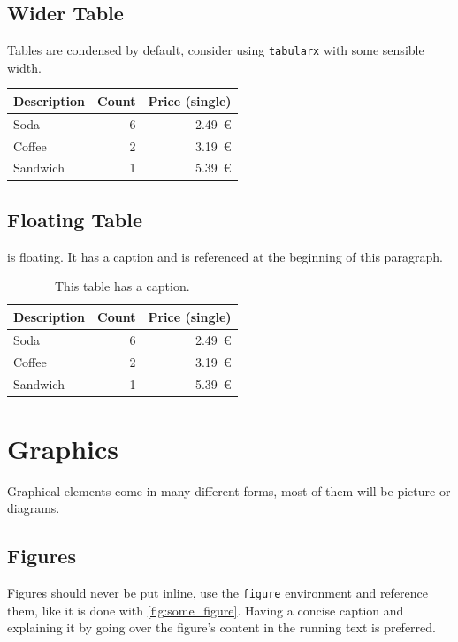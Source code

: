 \subsection{Wider Table}

Tables are condensed by default, consider using \texttt{tabularx} with some sensible width.

\begin{center}
\begin{tabularx}{0.75\textwidth}{Xrr}
	\toprule
	Description & Count & Price (single)\\
	\midrule
	Soda & 6 & 2.49~€\\
	Coffee & 2 & 3.19~€\\
	Sandwich & 1 & 5.39~€\\
	\bottomrule
\end{tabularx}
\end{center}

\subsection{Floating Table}

 is floating.
It has a caption and is referenced at the beginning of this paragraph.

\begin{table}
	\centering
	\begin{tabularx}{0.75\textwidth}{Xrr}
		\toprule
		Description & Count & Price (single)\\
		\midrule
		Soda & 6 & 2.49~€\\
		Coffee & 2 & 3.19~€\\
		Sandwich & 1 & 5.39~€\\
		\bottomrule
	\end{tabularx}
	\caption{This table has a caption.}
	\label{tbl:some_table}
\end{table}

\section{Graphics}

Graphical elements come in many different forms, most of them will be picture or diagrams.

\subsection{Figures}

Figures should never be put inline, use the \texttt{figure} environment and reference them, like it is done with \cref{fig:some_figure}.
Having a concise caption and explaining it by going over the figure's content in the running text is preferred.

